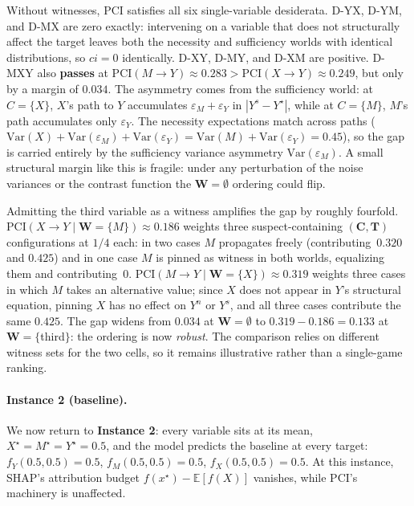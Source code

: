 Without witnesses, PCI satisfies all six single-variable desiderata.
D-YX, D-YM, and D-MX are zero exactly: intervening on a variable that does not
structurally affect the target leaves both the necessity and sufficiency
worlds with identical distributions, so $ci=0$ identically.
D-XY, D-MY, and D-XM are positive.
D-MXY also \textbf{passes} at $\mathrm{PCI}(M\to Y)\approx 0.283 > \mathrm{PCI}(X\to Y)\approx 0.249$,
but only by a margin of $0.034$. The asymmetry comes from the sufficiency
world: at $C{=}\{X\}$, $X$'s path to $Y$ accumulates
$\varepsilon_M+\varepsilon_Y$ in $|Y^s-Y^\star|$, while at $C{=}\{M\}$, $M$'s
path accumulates only $\varepsilon_Y$. The necessity expectations match
across paths ($\mathrm{Var}(X)+\mathrm{Var}(\varepsilon_M)+\mathrm{Var}(\varepsilon_Y)
=\mathrm{Var}(M)+\mathrm{Var}(\varepsilon_Y)=0.45$), so the gap is carried
entirely by the sufficiency variance asymmetry $\mathrm{Var}(\varepsilon_M)$.
A small structural margin like this is fragile: under any perturbation of
the noise variances or the contrast function the $\mathbf{W}=\emptyset$
ordering could flip.

Admitting the third variable as a witness amplifies the gap by roughly
fourfold.
$\mathrm{PCI}(X\to Y\mid\mathbf{W}{=}\{M\})\approx 0.186$ weights three
suspect-containing $(\mathbf{C},\mathbf{T})$ configurations at $1/4$ each: in two cases $M$
propagates freely (contributing~$0.320$ and $0.425$) and in one case $M$ is
pinned as witness in both worlds, equalizing them and contributing~$0$.
$\mathrm{PCI}(M\to Y\mid\mathbf{W}{=}\{X\})\approx 0.319$ weights three cases
in which $M$ takes an alternative value; since $X$ does not appear in $Y$'s
structural equation, pinning $X$ has no effect on $Y^n$ or $Y^s$, and all
three cases contribute the same $0.425$.
The gap widens from $0.034$ at $\mathbf{W}=\emptyset$ to
$0.319-0.186=0.133$ at $\mathbf{W}=\{$third$\}$: the ordering is now \emph{robust}.
The comparison relies on different witness sets for the two cells, so it
remains illustrative rather than a single-game ranking.

\paragraph{Instance 2 (baseline).}\label{sec:signal_baseline}
We now return to \textbf{Instance 2}: every variable sits at its mean,
$X^\star = M^\star = Y^\star = 0.5$, and the model predicts the baseline at every
target: $f_Y(0.5,0.5)=0.5$, $f_M(0.5,0.5)=0.5$, $f_X(0.5,0.5)=0.5$. At this
instance, SHAP's attribution budget $f(x^\star)-\mathbb{E}[f(X)]$ vanishes, while
PCI's machinery is unaffected.

